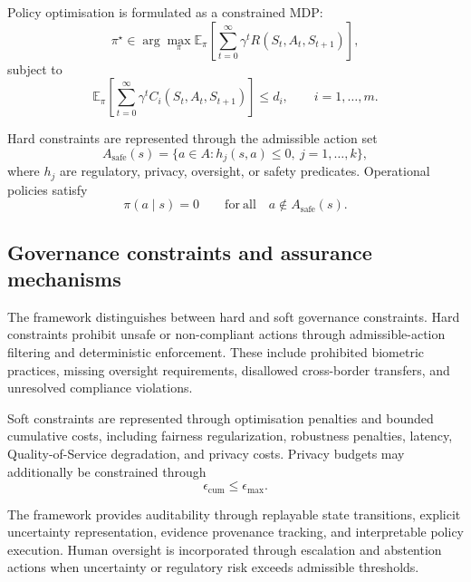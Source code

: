 \documentclass{article}
\begin{document}
Policy optimisation is formulated as a constrained MDP:
\begin{equation}
\pi^{\star}
\in
\arg\max_{\pi}
\mathbb{E}_{\pi}
\left[
\sum_{t=0}^{\infty}
\gamma^t R(S_t,A_t,S_{t+1})
\right],
\end{equation}
subject to
\begin{equation}
\mathbb{E}_{\pi}
\left[
\sum_{t=0}^{\infty}
\gamma^t C_i(S_t,A_t,S_{t+1})
\right]
\leq d_i,
\qquad i=1,\ldots,m.
\end{equation}

Hard constraints are represented through the admissible action set
\begin{equation}
A_{\mathrm{safe}}(s)
=
\{a\in A: h_j(s,a)\leq0,\ j=1,\ldots,k\},
\end{equation}
where \(h_j\) are regulatory, privacy, oversight, or safety predicates. Operational policies satisfy
\begin{equation}
\pi(a\mid s)=0
\qquad
\mathrm{for\ all}\quad
a\notin A_{\mathrm{safe}}(s).
\end{equation}

\subsection{Governance constraints and assurance mechanisms}

The framework distinguishes between hard and soft governance constraints. Hard constraints prohibit unsafe or non-compliant actions through admissible-action filtering and deterministic enforcement. These include prohibited biometric practices, missing oversight requirements, disallowed cross-border transfers, and unresolved compliance violations.

Soft constraints are represented through optimisation penalties and bounded cumulative costs, including fairness regularization, robustness penalties, latency, Quality-of-Service degradation, and privacy costs. Privacy budgets may additionally be constrained through
\begin{equation}
\epsilon_{\mathrm{cum}}\leq \epsilon_{\max}.
\end{equation}

The framework provides auditability through replayable state transitions, explicit uncertainty representation, evidence provenance tracking, and interpretable policy execution. Human oversight is incorporated through escalation and abstention actions when uncertainty or regulatory risk exceeds admissible thresholds.
\end{document}
